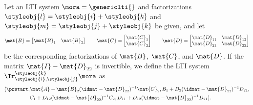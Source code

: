 {    \begin{definition}\label{def:trace-lti}
    Let an LTI system $\mora = \genericlti{}$ and factorizations $\styleobj{l} = \styleobj{i} + \styleobj{k}$ and $\styleobj{m} = \styleobj{j} + \styleobj{k}$ be given, and let 
        \begin{equation}\label{LTI-induced-block-forms}
\mat{B} = 
\begin{bmatrix}
\mat{B}_1 & \mat{B}_2
\end{bmatrix}
\qquad 
\mat{C} = 
\begin{bmatrix}
\mat{C}_1 \\
\mat{C}_2
\end{bmatrix}
\qquad
\mat{D} = 
\begin{bmatrix}
\mat{D}_{11} & \mat{D}_{12} \\
\mat{D}_{21} & \mat{D}_{22}
\end{bmatrix}
\end{equation}
    be the corresponding factorizations of $\mat{B}$, $\mat{C}$, and $\mat{D}$. If the matrix $\mat{I} - \mat{D}_{22}$ is invertible, we define the LTI system $\Tr_{\styleobj{i},\styleobj{j}}^{\styleobj{k}}\mora$ as
            \begin{equation}
            \begin{aligned}
                \langle\prstart, & \mat{A} + \mat{B}_2 (\idmat- \mat{D}_{22})^{-1} \mat{C}_2 , B_1 + D_2(\idmat- \mat{D}_{22})^{-1}D_{21}, \\
                                                                                                                & C_1 + D_{12}(\idmat- \mat{D}_{22})^{-1}C_2, D_{11} + D_{12}(\idmat- \mat{D}_{22})^{-1}D_{21} \rangle.
            \end{aligned}
        \end{equation}
    \end{definition}

}
